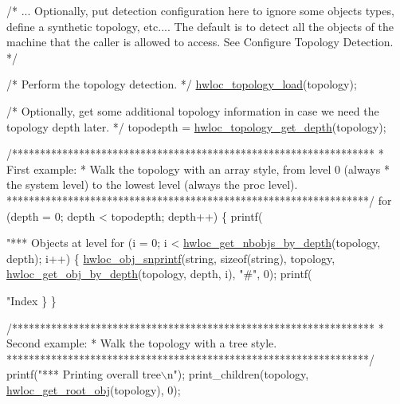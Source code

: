 \begin{DoxyCodeInclude}
{    \textcolor{comment}{/* ... Optionally, put detection configuration here to ignore}
\textcolor{comment}{       some objects types, define a synthetic topology, etc....  }
\textcolor{comment}{}
\textcolor{comment}{       The default is to detect all the objects of the machine that}
\textcolor{comment}{       the caller is allowed to access.  See Configure Topology}
\textcolor{comment}{       Detection. */}

    \textcolor{comment}{/* Perform the topology detection. */}
    \hyperlink{a00043_ga91e2e6427b95fb7339c99dbbef996e71}{hwloc_topology_load}(topology);

    \textcolor{comment}{/* Optionally, get some additional topology information}
\textcolor{comment}{       in case we need the topology depth later. */}
    topodepth = \hyperlink{a00046_ga8c30b0cec55074eb3ed34e4f2a1a9937}{hwloc_topology_get_depth}(topology);

    \textcolor{comment}{/*****************************************************************}
\textcolor{comment}{     * First example:}
\textcolor{comment}{     * Walk the topology with an array style, from level 0 (always}
\textcolor{comment}{     * the system level) to the lowest level (always the proc level).}
\textcolor{comment}{     *****************************************************************/}
    \textcolor{keywordflow}{for} (depth = 0; depth < topodepth; depth++) \{
        printf(\textcolor{stringliteral}{"*** Objects at level %
        \textcolor{keywordflow}{for} (i = 0; i < \hyperlink{a00046_ga20cfe2456f4cfdd789c9aca6d2fdd69f}{hwloc_get_nbobjs_by_depth}(topology, depth); 
             i++) \{
            \hyperlink{a00048_ga5c6a61a83f4790b421e2f62e9088446f}{hwloc_obj_snprintf}(\textcolor{keywordtype}{string}, \textcolor{keyword}{sizeof}(\textcolor{keywordtype}{string}), topology,
                       \hyperlink{a00047_gaedd78240b0c1108355586a268ec5a697}{hwloc_get_obj_by_depth}(topology, depth, i),
                       \textcolor{stringliteral}{"#"}, 0);
            printf(\textcolor{stringliteral}{"Index %
        \}
    \}

    \textcolor{comment}{/*****************************************************************}
\textcolor{comment}{     * Second example:}
\textcolor{comment}{     * Walk the topology with a tree style.}
\textcolor{comment}{     *****************************************************************/}
    printf(\textcolor{stringliteral}{"*** Printing overall tree\(\backslash\)n"});
    print\_children(topology, \hyperlink{a00053_gadbf58f6e187efbdb3cd9a8e30311b7d7}{hwloc_get_root_obj}(topology), 0);

}}}
\end{DoxyCodeInclude}
